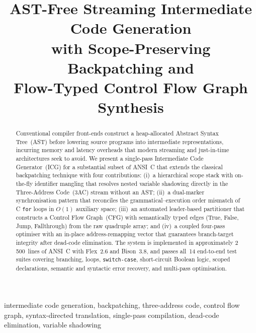 \documentclass[conference]{IEEEtran}
\begin{document}
\title{AST-Free Streaming Intermediate Code Generation\\with Scope-Preserving Backpatching and\\Flow-Typed Control Flow Graph Synthesis}

\author{
\and
{}
\and
{}
}

\maketitle

\begin{abstract}
Conventional compiler front-ends construct a heap-allocated Abstract Syntax Tree~(AST) before lowering source programs into intermediate representations, incurring memory and latency overheads that modern streaming and just-in-time architectures seek to avoid. We present a single-pass Intermediate Code Generator~(ICG) for a substantial subset of ANSI~C that extends the classical backpatching technique with four contributions: (i)~a hierarchical scope stack with on-the-fly identifier mangling that resolves nested variable shadowing directly in the Three-Address Code~(3AC) stream without an AST; (ii)~a dual-marker synchronisation pattern that reconciles the grammatical--execution order mismatch of C \texttt{for} loops in $O(1)$ auxiliary space; (iii)~an automated leader-based partitioner that constructs a Control Flow Graph~(CFG) with semantically typed edges (True, False, Jump, Fallthrough) from the raw quadruple array; and (iv)~a coupled four-pass optimiser with an in-place address-remapping vector that guarantees branch-target integrity after dead-code elimination. The system is implemented in approximately 2\,500~lines of ANSI~C with Flex~2.6 and Bison~3.8, and passes all~14 end-to-end test suites covering branching, loops, \texttt{switch-case}, short-circuit Boolean logic, scoped declarations, semantic and syntactic error recovery, and multi-pass optimisation.
\end{abstract}

\begin{IEEEkeywords}
intermediate code generation, backpatching, three-address code, control flow graph, syntax-directed translation, single-pass compilation, dead-code elimination, variable shadowing
\end{IEEEkeywords}
\end{document}
